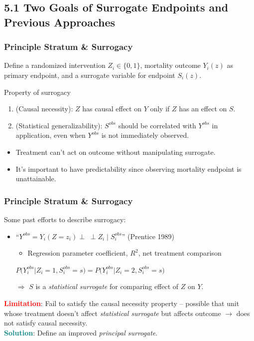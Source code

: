 \documentclass[10pt]{beamer}
\newcommand{\zuokh}{\Big (}
\newcommand{\youkh}{\Big )}
\newcommand{\given}{\;|\;}
\newcommand{\ind}{\perp\!\!\!\!\!\;\perp}
\begin{document}
\subsection{5.1 Two Goals of Surrogate Endpoints and Previous Approaches}
\begin{frame}
\frametitle{Principle Stratum \& Surrogacy}
Define a randomized intervention $Z_i\in \{0,1\}$, mortality outcome $Y_i(z)$ as primary endpoint, and a surrogate variable for endpoint $S_i(z)$.\\
\vspace{1\baselineskip}
\begin{block}{Property of surrogacy}
\begin{enumerate}
	\item (Causal necessity): $Z$  has causal effect on $Y$ only if $Z$ has an effect on $S$.
	\item (Statistical generalizability):  $S^{obs}$ should be correlated with $Y^{obs}$ in application, even when $Y^{obs}$ is not immediately observed.
\end{enumerate}
\end{block}

\begin{itemize}
	\item Treatment can't act on outcome without manipulating surrogate.
	\item It's important to have predictability since observing mortality endpoint is unattainable.
\end{itemize}
\end{frame}

\begin{frame}
\frametitle{Principle Stratum \& Surrogacy}
Some past efforts to describe surrogacy:
\begin{itemize}
	\item ``$Y^{obs} = Y_i(Z=z_i)\ind Z_i \given S^{obs}_i$'' (Prentice 1989)
	\begin{itemize}
		\item Regression parameter coefficient, $R^2$, net treatment comparison
	\end{itemize}
\begin{definition}
\vspace{3mm}
$\displaystyle P\zuokh Y_i^{obs}\Big | Z_i=1,S^{obs}_i=s\youkh = P\zuokh Y_i^{obs}\Big | Z_i=2, S^{obs}_i=s\youkh$\\
\vspace{3mm}

\hfill  $\Longrightarrow$ $S$ is a \emph{statistical surrogate} for comparing effect of $Z$ on $Y$.
\end{definition}
\end{itemize}
\textcolor{red}{\bf Limitation}: Fail to satisfy the causal necessity property -- possible that unit whose treatment doesn't affect \emph{statistical surrogate} but affects outcome $\longrightarrow$ does not satisfy causal necessity.\\
\textcolor{teal}{\bf Solution}: Define an improved \emph{principal surrogate}.
\end{frame}
\end{document}
